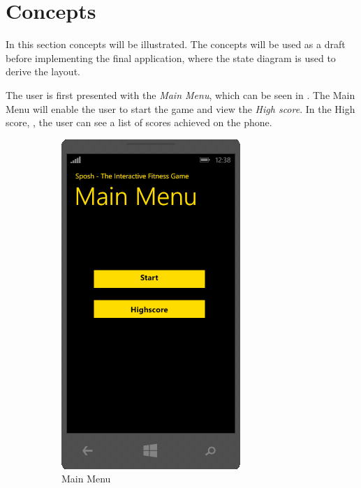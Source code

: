 \section{Concepts}\label{section:prototype}
In this section concepts will be illustrated. 
The concepts will be used as a draft before implementing the final application, where the state diagram  is used to derive the layout.

The user is first presented with the \textit{Main Menu}, which can be seen in .
The Main Menu will enable the user to start the game and view the \textit{High score}.
In the High score, , the user can see a list of scores achieved on the phone.

\begin{figure}[H]
	\centering
	\begin{subfigure}[b]{0.3\textwidth}
	\includegraphics[scale = 0.55]{media/prototype/main-menu.png}
	\caption{Main Menu}
	\label{figure:main-menu}
	\end{subfigure}
	\qquad
	\begin{subfigure}[b]{0.3\textwidth}

\end{subfigure}
\end{figure}
